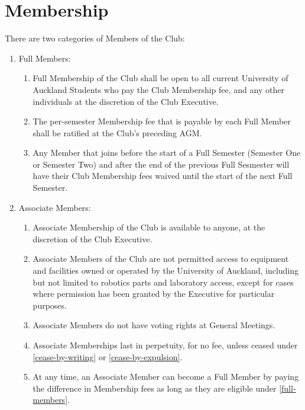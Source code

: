 \documentclass[a4paper]{article}
\begin{document}
	\section{Membership}
	There are two categories of Members of the Club:
	\begin{enumerate}
		\item \label{full-members} Full Members:
		\begin{enumerate}
			\item Full Membership of the Club shall be open to all current University of Auckland Students who pay the Club Membership fee, and any other individuals at the discretion of the Club Executive.
			
			\item The per-semester Membership fee that is payable by each Full Member shall be ratified at the Club's preceding \ac{AGM}.
			
      \item Any Member that joins before the start of a Full Semester (Semester One or Semester Two) and after the end of the previous Full Sesmester will have their Club Membership fees waived until the start of the next Full Semester.
		\end{enumerate}
	
		\item Associate Members:
		\begin{enumerate}
			\item Associate Membership of the Club is available to anyone, at the discretion of the Club Executive.
			
			\item Associate Members of the Club are not permitted access to equipment and facilities owned or operated by the University of Auckland, including but not limited to robotics parts and laboratory access, except for cases where permission has been granted by the Executive for particular purposes.
			
			\item Associate Members do not have voting rights at General Meetings.
			
			\item Associate Memberships last in perpetuity, for no fee, unless ceased under \ref{cease-by-writing} or \ref{cease-by-expulsion}.
			
			\item At any time, an Associate Member can become a Full Member by paying the difference in Membership fees as long as they are eligible under \ref{full-members}.
		\end{enumerate}
	\end{enumerate}
	
\end{document}
